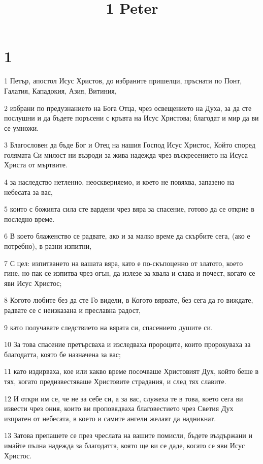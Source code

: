 

\title{1 Peter}


\chapter{1}

\par 1 Петър, апостол Исус Христов, до избраните пришелци, пръснати по Понт, Галатия, Кападокия, Азия, Витиния,
\par 2 избрани по предузнанието на Бога Отца, чрез освещението на Духа, за да сте послушни и да бъдете поръсени с кръвта на Исус Христова; благодат и мир да ви се умножи.
\par 3 Благословен да бъде Бог и Отец на нашия Господ Исус Христос, Който според голямата Си милост ни възроди за жива надежда чрез въскресението на Исуса Христа от мъртвите.
\par 4 за наследство нетленно, неоскверняемо, и което не повяхва, запазено на небесата за вас,
\par 5 които с божията сила сте вардени чрез вяра за спасение, готово да се открие в последно време.
\par 6 В което блаженство се радвате, ако и за малко време да скърбите сега, (ако е потребно), в разни изпитни,
\par 7 С цел: изпитването на вашата вяра, като е по-скъпоценно от златото, което гине, но пак се изпитва чрез огън, да излезе за хвала и слава и почест, когато се яви Исус Христос;
\par 8 Когото любите без да сте Го видели, в Когото вярвате, без сега да го виждате, радвате се с неизказана и преславна радост,
\par 9 като получавате следствието на вярата си, спасението душите си.
\par 10 За това спасение претърсваха и изследваха пророците, които пророкуваха за благодатта, която бе назначена за вас;
\par 11 като издирваха, кое или какво време посочваше Христовият Дух, който беше в тях, когато предизвестяваше Христовите страдания, и след тях славите.
\par 12 И откри им се, че не за себе си, а за вас, служеха те в това, което сега ви извести чрез ония, които ви проповядваха благовестието чрез Светия Дух изпратен от небесата, в което и самите ангели желаят да надникнат.
\par 13 Затова препашете се през чреслата на вашите помисли, бъдете въздържани и имайте пълна надежда за благодатта, която ще ви се даде, когато се яви Исус Христос.
